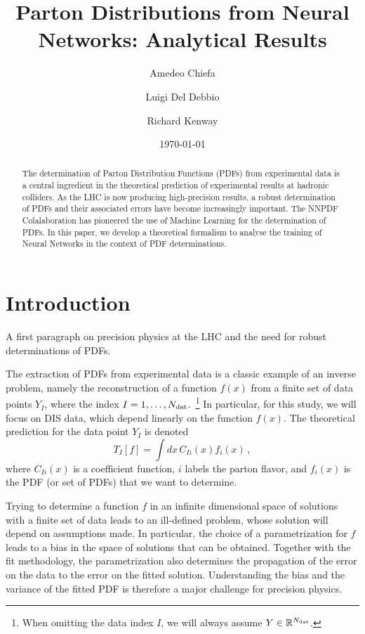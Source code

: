 \documentclass[11pt]{article}
\title{Parton Distributions from Neural Networks: Analytical Results}
\author{Amedeo Chiefa}
\author{Luigi Del Debbio}
\author{Richard Kenway}
\affil{Higgs Centre for Theoretical Physics, School of Physics and Astronomy,
Peter~Guthrie~Tait~Road, Edinburgh EH9 3 FD, United Kingdom.}
\date{\today}
\begin{document}
\maketitle

\begin{abstract}
    The determination of Parton Distribution Functions (PDFs) from experimental data
    is a central ingredient in the theoretical prediction of experimental results 
    at hadronic colliders. As the LHC is now producing high-precision results, a robust 
    determination of PDFs and their associated errors have become increasingly important. 
    The NNPDF Colalaboration has pioneered the use of Machine Learning for the determination
    of PDFs. In this paper, we develop a theoretical formalism to analyse the training of
    Neural Networks in the context of PDF determinations. 
\end{abstract}

\section{Introduction}
\label{sec:intro}

A first paragraph on precision physics at the LHC and the need for robust determinations of PDFs.

The extraction of PDFs from experimental data is a classic example of an inverse problem, 
namely the reconstruction of a function $f(x)$ from a finite set of data points 
$Y_I$, where the index $I=1, \ldots, N_{\mathrm{dat}}$.~\footnote{When omitting the data index $I$, we will always
assume $Y \in \mathbb{R}^{N_{\mathrm{dat}}}$.} In particular, for this study, we will focus 
on DIS data, which depend 
linearly on the function $f(x)$. The theoretical prediction for the data point $Y_I$ is denoted
\begin{equation}
    \label{eq:TheoryPred}
    T_I[f] = \int dx\, C_{Ii}(x) f_{i}(x)\, ,
\end{equation}
where $C_{Ii}(x)$ is a coefficient function, $i$ labels the parton flavor, and $f_i(x)$ 
is the PDF (or set of PDFs) that we want to determine. 

Trying to determine a function $f$ in an infinite dimensional space of solutions with a finite
set of data leads to an ill-defined problem, whose solution will depend on assumptions made. 
In particular, the choice of a parametrization for $f$ leads to a bias in the space
of solutions that can be obtained. Together with the fit methodology, the parametrization also 
determines the propagation of the error on the data to the error on the fitted solution. Understanding
the bias and the variance of the fitted PDF is therefore a major challenge for precision physics. 
\end{document}
